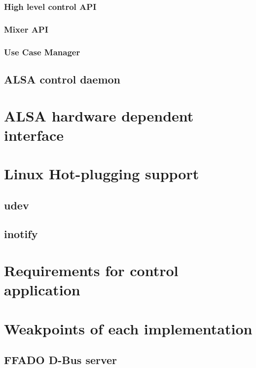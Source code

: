 \documentclass[onecolumn]{article}
\begin{document}
\subsubsection{High level control API}

\subsubsection{Mixer API}



\subsubsection{Use Case Manager}

\subsection{ALSA control daemon}

\section{ALSA hardware dependent interface}

\section{Linux Hot-plugging support}

\subsection{udev}

\subsection{inotify}

\section{Requirements for control application}

\section{Weakpoints of each implementation}

\subsection{FFADO D-Bus server}
\end{document}
